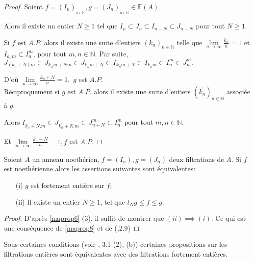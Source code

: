 \begin{proof}
	Soient $f=(I_{n})_{_{n\in \mathbb{N}}},g=(J_{n})_{_{n\in\mathbb{N}}}\in \mathbb{F}(A).$
	
	Alors il existe un entier $N\geq 1$ tel que $I_{n}\subset J_{n}\subset
	I_{n-N}\subset J_{n-N}$ pour tout $N\geq 1.$
	
	Si $f$ est $A.P.$ alors il existe une suite d'entiers $(k_{n})_{n\in \mathbb{N}}$ telle que $\underset{n\longrightarrow \infty }{\lim }\frac{k_{n}}{n}=1$ et $I_{k_{n}m}\subset I_{n}^{m}$,
	pour tout $m,n\in \mathbb{N}.$
	Par suite, $J_{(k_{n}+N)m}\subset J_{k_{n}m+Nm}\subset J_{k_{n}m+N}\subset I_{k_{n}m+N}\subset I_{k_{n}m}\subset I_{n}^{m}\subset J_{n}^{m}.$
	
	D'où $\underset{n\longrightarrow \infty }{\lim }\frac{k_{n}+N}{n}=1,$ $g$ est $A.P.$\\
	Réciproquement si $g$ est $A.P.$ alors il existe une suite d'entiers $(k_{n}^{^{\prime }})_{n\in \mathbb{N}}$ associée à $g.$
	
	Alors $I_{k_{n}^{\prime }+N.m}\subset J_{k_{n}^{\prime }+N.m}\subset J_{n+N}^{m}\subset I_{n}^{m}$ pour tout $m,n\in \mathbb{N}.$
	
	Et $\underset{n\longrightarrow \infty }{\lim }\frac{k_{n}^{\prime }+N}{n}=1,f$ est $A.P.$
\end{proof}
\begin{maproposition}
	\label{maprop10}
	Soient $A$ un anneau noethérien, $f=(I_n) , g=(J_n)$ deux filtrations de $A$. Si $f$ est noethérienne alors les assertions suivantes sont équivalentes:
	\begin{enumerate}
		\item[(i)] $g$ est fortement entière sur $f$;
		\item[(ii)] Il existe un entier $N \geqslant 1$, tel que $t_Ng \leqslant f \leqslant g$.
	\end{enumerate}
\end{maproposition}
\begin{proof}
	D'après \ref{maprop6} (3), il suffit de montrer que $(ii) \implies (i)$. Ce qui est une conséquence de \ref{maprop8} et de (\cite{Ok},2.9)
\end{proof}
\begin{maremarque}
	\label{maprop12}
	Sous certaines conditions (voir \cite{Di1}, 3.1 (2), (b)) certaines propositions sur les filtrations entières sont équivalentes avec des filtrations fortement entières. 
\end{maremarque}

